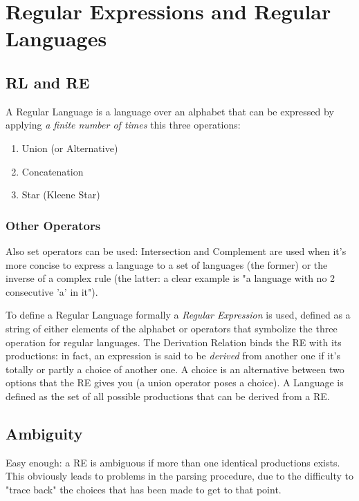 \chapter{Regular Expressions and Regular Languages}
    \section{RL and RE}
        A Regular Language is a language over an alphabet that can be expressed by applying \emph{a finite number of times} this three operations:
        \begin{enumerate}
            \item Union (or Alternative)
            \item Concatenation
            \item Star (Kleene Star)
        \end{enumerate}
        
        \subsection{Other Operators}
            Also set operators can be used: Intersection and Complement are used when it's more concise to express a language to a set of languages (the former) or the inverse of a complex rule (the latter: a clear example is "a language with no 2 consecutive 'a' in it").
        
        To define a Regular Language formally a \emph{Regular Expression} is used, defined as a string of either elements of the alphabet or operators that symbolize the three operation for regular languages.
        The Derivation Relation binds the RE with its productions: in fact, an expression is said to be \emph{derived} from another one if it's totally or partly a choice of another one. A choice is an alternative between two options that the RE gives you (a union operator poses a choice). A Language is defined as the set of all possible productions that can be derived from a RE.

    \section{Ambiguity}
        Easy enough: a RE is ambiguous if more than one identical productions exists. This obviously leads to problems in the parsing procedure, due to the difficulty to "trace back" the choices that has been made to get to that point. 

